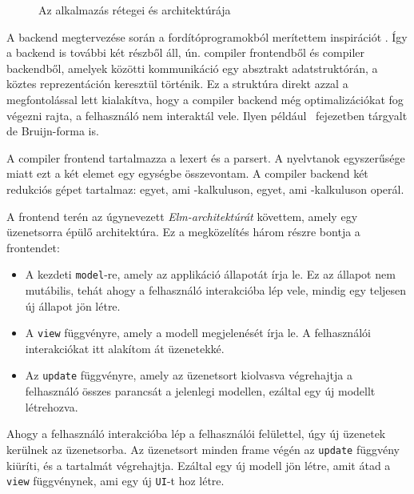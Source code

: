 \documentclass[a4paper,oneside,12pt]{article}
\begin{document}
\begin{figure}[htbp]
{
  }
  \captionsetup{justification=centering}
  \caption{Az alkalmazás rétegei és architektúrája}
  \label{fig:tikz-arch}
\end{figure}

A backend megtervezése során a fordítóprogramokból merítettem inspirációt \cite{EngineeringCompiler2023}. Így a backend is további két részből áll, ún. compiler frontendből és compiler backendből, amelyek közötti kommunikáció egy absztrakt adatstruktórán, a köztes reprezentáción keresztül történik. Ez a struktúra direkt azzal a megfontolással lett kialakítva, hogy a compiler backend még optimalizációkat fog végezni rajta, a felhasználó nem interaktál vele. Ilyen például ~fejezetben tárgyalt de Bruijn-forma is.

A compiler frontend tartalmazza a lexert és a parsert. A nyelvtanok egyszerűsége miatt ezt a két elemet egy egységbe összevontam. A
compiler backend két redukciós gépet tartalmaz: egyet, ami \lam-kalkuluson, egyet, ami \ski-kalkuluson operál.

A frontend terén az úgynevezett \emph{Elm-architektúrát} \cite{elmArchitectureGuide} követtem, amely egy üzenetsorra épülő architektúra. Ez a megközelítés három részre bontja a frontendet:
\begin{itemize}
  \item A kezdeti \texttt{model}-re, amely az applikáció állapotát írja le. Ez az állapot nem mutábilis, tehát ahogy a felhasználó interakcióba lép vele, mindig egy teljesen új állapot jön létre.
  \item A \texttt{view} függvényre, amely a modell megjelenését írja le. A felhasználói interakciókat itt alakítom át üzenetekké.
  \item Az \texttt{update} függvényre, amely az üzenetsort kiolvasva végrehajtja a felhasználó összes parancsát a jelenlegi modellen, ezáltal egy új modellt létrehozva.
\end{itemize}
Ahogy a felhasználó interakcióba lép a felhasználói felülettel, úgy új üzenetek kerülnek az üzenetsorba. Az üzenetsort minden frame végén az \texttt{update} függvény kiüríti, és a tartalmát végrehajtja. Ezáltal egy új modell jön létre, amit átad a \texttt{view} függvénynek, ami egy új \texttt{UI}-t hoz létre.
\end{document}
